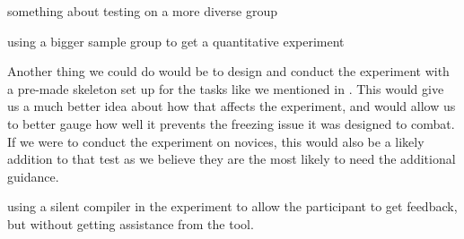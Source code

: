 something about testing on a more diverse group

using a bigger sample group to get a quantitative experiment

Another thing we could do would be to design and conduct the experiment with a pre-made skeleton set up for the tasks like we mentioned in .
This would give us a much better idea about how that affects the experiment, and would allow us to better gauge how well it prevents the freezing issue it was designed to combat.
If we were to conduct the experiment on novices, this would also be a likely addition to that test as we believe they are the most likely to need the additional guidance. 

using a silent compiler in the experiment to allow the participant to get feedback, but without getting assistance from the tool.